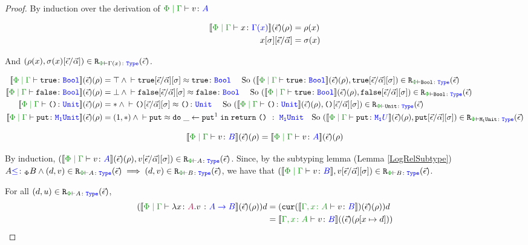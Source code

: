 \documentclass{Report}
\newcommand\erelates[2]{\texttt{R}_{\wellformedt{#1}{#2}}}
\newcommand{\av}[0]{\vec{\a}}
\newcommand\inLogRel[5]{(#1, #2)\in\erelates{#3}{#4}(#5)}
\newcommand\inLogRelE[4]{\inLogRel{#1}{#2}{#3}{#4}{\ev}}
\newcommand{\inLogRelPE}[3]{\inLogRelE{#1}{#2}{\P}{#3}}
\newcommand\fundSub[0]{\ssub{\av}{\ev}\ssi}
\newcommand\fundRho[0]{(\ev)(\rho)}
\newcommand\fundRhoExt[1]{(\ev)(\rho#1)}
\begin{document}
\begin{proof}
    By induction over the derivation of $\gpetyperelation{v}{A}$

    \begin{align*}
        \deno{\gpetyperelation{x}{\G(x)}}\fundRho & = \rho(x) \\
        x\ssi\ssub{\av}{\ev} & = \si(x)\\
    \end{align*}

    And $\inLogRelPE{\rho(x)}{\si(x)\ssub{\av}{\ev}}{\G(x)}$.

    \begin{align*}
        \deno{\gpetyperelation{\t}{\B}}\fundRho & = \top \wedge \zberelation{\t\fundSub}{\t}{\B} \qt{ So } \inLogRelPE{\deno{\gpetyperelation{\t}{\B}}\fundRho}{\t\fundSub}{\B}\\
        \deno{\gpetyperelation{\f}{\B}}\fundRho & = \bot \wedge \zberelation{\f\fundSub}{\f}{\B} \qt{ So } \inLogRelPE{\deno{\gpetyperelation{\t}{\B}}\fundRho}{\f\fundSub}{\B}\\
        \deno{\gpetyperelation{\u}{\U}}\fundRho & = \singleton \wedge \zberelation{\u\fundSub}{\u}{\U} \qt{ So } \inLogRelPE{\deno{\gpetyperelation{\u}{\U}}\fundRho}{\u\fundSub}{\U}\\
        \deno{\gpetyperelation{\put}{\M{1}{\U}}}\fundRho & = (1, \singleton)\wedge \zberelation{\put}{\doin{\_}{\put^1}{\return{\u}}}{\s\M{\1}{\U}}\qt{So }\inLogRelPE{\deno{\gpetyperelation{\put}{\M{\1}{U}}}\fundRho}{\put\fundSub}{\M{\1}{\U}}\\ 
    \end{align*}


    \case{\vsubtype}

    \begin{equation}
        \deno{\gpetyperelation{v}{B}}\fundRho = \deno{\gpetyperelation{v}{A}}\fundRho
    \end{equation}

    By induction, $\inLogRelPE{\deno{\gpetyperelation{v}{A}}\fundRho}{v\fundSub}{A}$.
    Since, by the subtyping lemma (Lemma \ref{LogRelSubtype}) $A\subtypep B \wedge \inLogRelPE{d}{v}{A} \implies \inLogRelPE{d}{v}{B}$, we have that $\inLogRelPE{\deno{\gpetyperelation{v}{B}}}{v\fundSub}{B}$.

    \case{\vfun}

    For all $\inLogRelPE{d}{u}{A}$, 
    \begin{align*}
        (\deno{\gpetyperelation{\lam{x}{A}{v}}{\ab}}\fundRho) d & = (\cur{\deno{\typerelation{\gax}{v}{B}}}\fundRho) d\\
        & = \deno{\typerelation{\gax}{v}{B}} (\fundRhoExt{[x\mapsto d]})\\
    \end{align*}


\end{proof}
\end{document}
